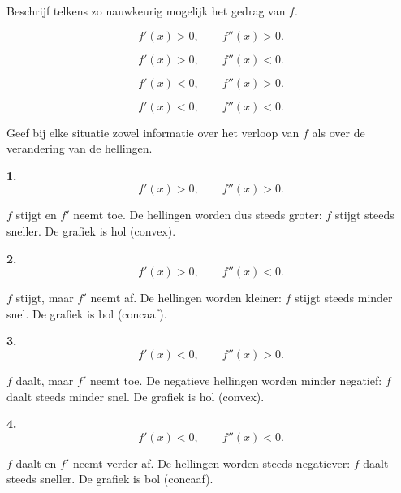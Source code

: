 \documentclass{ximera}
\begin{document}

\begin{oefening}{\oefU\ESS}

Beschrijf telkens zo nauwkeurig mogelijk het gedrag van $f$.

\begin{question}
\[
f'(x)>0,\qquad f''(x)>0.
\]
\end{question}

\begin{question}
\[
f'(x)>0,\qquad f''(x)<0.
\]
\end{question}

\begin{question}
\[
f'(x)<0,\qquad f''(x)>0.
\]
\end{question}

\begin{question}
\[
f'(x)<0,\qquad f''(x)<0.
\]
\end{question}

Geef bij elke situatie zowel informatie over het verloop van $f$
als over de verandering van de hellingen.

\begin{oplossing}

\textbf{1.}
\[
f'(x)>0,\qquad f''(x)>0.
\]

$f$ stijgt en $f'$ neemt toe. De hellingen worden dus steeds groter:
$f$ stijgt steeds sneller. De grafiek is hol (convex).

\medskip

\textbf{2.}
\[
f'(x)>0,\qquad f''(x)<0.
\]

$f$ stijgt, maar $f'$ neemt af. De hellingen worden kleiner:
$f$ stijgt steeds minder snel. De grafiek is bol (concaaf).

\medskip

\textbf{3.}
\[
f'(x)<0,\qquad f''(x)>0.
\]

$f$ daalt, maar $f'$ neemt toe. De negatieve hellingen worden minder
negatief: $f$ daalt steeds minder snel. De grafiek is hol (convex).

\medskip

\textbf{4.}
\[
f'(x)<0,\qquad f''(x)<0.
\]

$f$ daalt en $f'$ neemt verder af. De hellingen worden steeds negatiever:
$f$ daalt steeds sneller. De grafiek is bol (concaaf).

\end{oplossing}

\end{oefening}
\end{document}
